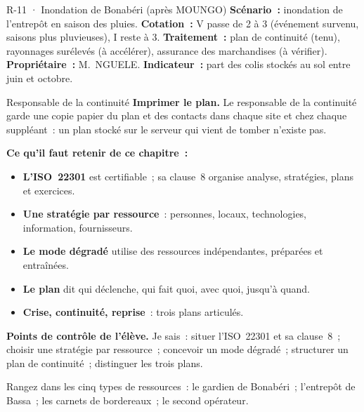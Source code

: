 \begin{boxobjet}{R-11 · Inondation de Bonabéri (après MOUNGO)}
\textbf{Scénario~:} inondation de l'entrepôt en saison des pluies.
\textbf{Cotation~:} V passe de 2 à 3 (événement survenu, saisons plus
pluvieuses), I reste à 3. \textbf{Traitement~:} plan de continuité (tenu),
rayonnages surélevés (à accélérer), assurance des marchandises (à
vérifier). \textbf{Propriétaire~:} M.~NGUELE. \textbf{Indicateur~:} part des
colis stockés au sol entre juin et octobre.
\end{boxobjet}

\begin{boxmetier}{Responsable de la continuité}
\textbf{Imprimer le plan.} Le responsable de la continuité garde une copie
papier du plan et des contacts dans chaque site et chez chaque suppléant~:
un plan stocké sur le serveur qui vient de tomber n'existe pas.
\end{boxmetier}

\separateur

\begin{boxresume}
\textbf{Ce qu'il faut retenir de ce chapitre~:}
\begin{itemize}
    \item \textbf{L'ISO~22301} est certifiable~; sa clause~8 organise
          analyse, stratégies, plans et exercices.
    \item \textbf{Une stratégie par ressource}~: personnes, locaux,
          technologies, information, fournisseurs.
    \item \textbf{Le mode dégradé} utilise des ressources indépendantes,
          préparées et entraînées.
    \item \textbf{Le plan} dit qui déclenche, qui fait quoi, avec quoi,
          jusqu'à quand.
    \item \textbf{Crise, continuité, reprise}~: trois plans articulés.
\end{itemize}
\end{boxresume}

\begin{boxinfo}
\textbf{Points de contrôle de l'élève.} Je sais~: situer l'ISO~22301 et sa
clause~8~; choisir une stratégie par ressource~; concevoir un mode
dégradé~; structurer un plan de continuité~; distinguer les trois plans.
\end{boxinfo}

\bigskip

\begin{boxexo}[title={\ding{45}\quad Exercice~18.1. Ressources \niveaubase}]
Rangez dans les cinq types de ressources~: le gardien de Bonabéri~;
l'entrepôt de Bassa~; les carnets de bordereaux~; le second opérateur.
\end{boxexo}

